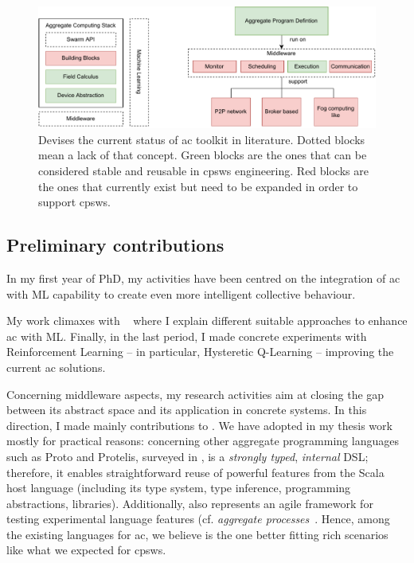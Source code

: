 \documentclass[11pt]{article}
\begin{document}
\begin{figure}[t]
	\centering
	\includegraphics[width=\textwidth]{img/to-do-for-thesis.pdf}
	\caption{Devises the current status of \ac{ac} toolkit in literature. Dotted blocks mean a lack of that concept. Green blocks are the ones that can be considered stable and reusable in \acp{cpsw} engineering. Red blocks are the ones that currently exist but need to be expanded in order to support \acp{cpsw}.}
	\label{fig:current-state}
\end{figure}
\subsection{Preliminary contributions}
In my first year of PhD, my activities have been centred on
the integration of \ac{ac} with ML capability to create even more
intelligent collective behaviour. 

My work climaxes with ~\cite{research} where I explain different suitable approaches to
enhance \ac{ac} with ML. Finally, in the last period, I made concrete
experiments with Reinforcement Learning -- in particular, Hysteretic Q-Learning \cite{hysteretic-q} -- improving the current \ac{ac} solutions.

Concerning middleware aspects, my research activities aim at closing the gap between
its abstract space and its application in concrete systems. In this direction, I made mainly contributions to \scafi{}.
%
We have adopted \scafi{} in my thesis work mostly for practical reasons: concerning other aggregate programming languages such as Proto and Protelis, surveyed in \cite{viroli2019jlamp-si-coord},
%
\scafi{} is a \emph{strongly typed}, \emph{internal} DSL; therefore, it enables straightforward reuse of powerful features from the Scala host language (including its type system, type inference, programming abstractions, libraries).
%
Additionally, \scafi{} also represents an agile framework for testing experimental language features (cf. \emph{aggregate processes}~\cite{DBLP:journals/eaai/CasadeiVAPD21}.
%
Hence, among the existing languages for \ac{ac}, we believe \scafi{} is the one better fitting rich scenarios like what we expected for \acp{cpsw}.
\end{document}
